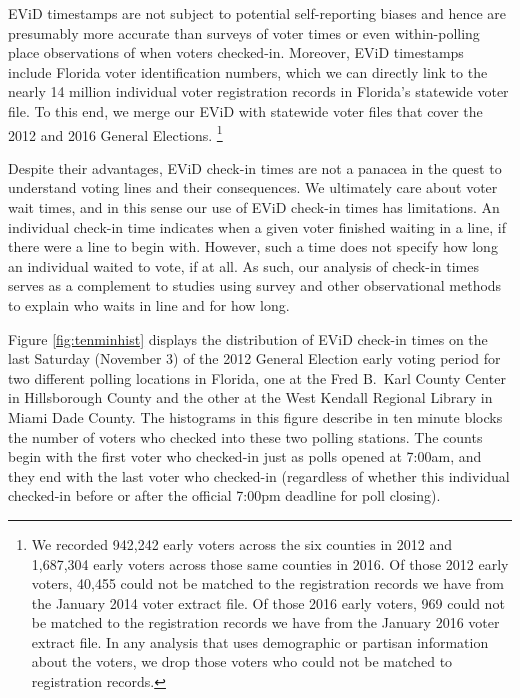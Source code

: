 \documentclass[12pt,titlepage]{article}
\begin{document}
EViD timestamps are not subject to potential self-reporting biases and
hence are presumably more accurate than surveys of voter times or even
within-polling place observations of when voters checked-in.
Moreover, EViD timestamps include Florida voter identification
numbers, which we can directly link to the nearly 14 million
individual voter registration records in Florida's statewide voter
file.  To this end, we merge our EViD with statewide voter files that
cover the 2012 and 2016 General Elections. \footnote{ We recorded 942,242 
early voters across the six counties in 2012 and 1,687,304 early voters across those
same counties in 2016.   Of those 2012 early voters, 40,455 could not be matched
to the registration records we have from the January 2014 voter extract file. 
Of those 2016 early voters, 969 could not be matched
to the registration records we have from the January 2016 voter extract file. 
In any analysis that uses demographic or partisan information about the voters,
we drop those voters who could not be matched to registration records.}


Despite their advantages, EViD check-in times are not a panacea in the
quest to understand voting lines and their consequences.  We
ultimately care about voter wait times, and in this sense our use of
EViD check-in times has limitations.  An individual check-in time
indicates when a given voter finished waiting in a line, if there were
a line to begin with.  However, such a time does not specify how long
an individual waited to vote, if at all. As such, our analysis of
check-in times serves as a complement to studies using survey and
other observational methods to explain who waits in line and for how
long.

Figure \ref{fig:tenminhist} displays the distribution of EViD check-in
times on the last Saturday (November 3) of the 2012 General Election
early voting period for two different polling locations in Florida,
one at the Fred B.\ Karl County Center in Hillsborough County and the
other at the West Kendall Regional Library in Miami Dade County.  The
histograms in this figure describe in ten minute blocks the number of
voters who checked into these two polling stations.  The counts begin
with the first voter who checked-in just as polls opened at 7:00am,
and they end with the last voter who checked-in (regardless of whether
this individual checked-in before or after the official 7:00pm
deadline for poll closing).
\end{document}
